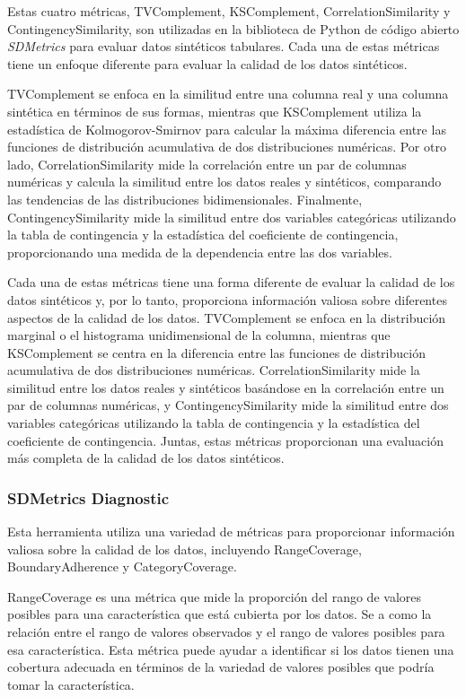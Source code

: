 Estas cuatro métricas, TVComplement, KSComplement, CorrelationSimilarity y ContingencySimilarity, son utilizadas en la biblioteca de Python de código abierto \emph{SDMetrics} para evaluar datos sintéticos tabulares. Cada una de estas métricas tiene un enfoque diferente para evaluar la calidad de los datos sintéticos.

TVComplement se enfoca en la similitud entre una columna real y una columna sintética en términos de sus formas, mientras que KSComplement utiliza la estadística de Kolmogorov-Smirnov para calcular la máxima diferencia entre las funciones de distribución acumulativa de dos distribuciones numéricas. Por otro lado, CorrelationSimilarity mide la correlación entre un par de columnas numéricas y calcula la similitud entre los datos reales y sintéticos, comparando las tendencias de las distribuciones bidimensionales. Finalmente, ContingencySimilarity mide la similitud entre dos variables categóricas utilizando la tabla de contingencia y la estadística del coeficiente de contingencia, proporcionando una medida de la dependencia entre las dos variables.

Cada una de estas métricas tiene una forma diferente de evaluar la calidad de los datos sintéticos y, por lo tanto, proporciona información valiosa sobre diferentes aspectos de la calidad de los datos. TVComplement se enfoca en la distribución marginal o el histograma unidimensional de la columna, mientras que KSComplement se centra en la diferencia entre las funciones de distribución acumulativa de dos distribuciones numéricas. CorrelationSimilarity mide la similitud entre los datos reales y sintéticos basándose en la correlación entre un par de columnas numéricas, y ContingencySimilarity mide la similitud entre dos variables categóricas utilizando la tabla de contingencia y la estadística del coeficiente de contingencia. Juntas, estas métricas proporcionan una evaluación más completa de la calidad de los datos sintéticos.

\subsubsection{SDMetrics Diagnostic}

Esta herramienta utiliza una variedad de métricas para proporcionar información valiosa sobre la calidad de los datos, incluyendo RangeCoverage, BoundaryAdherence y CategoryCoverage.

RangeCoverage es una métrica que mide la proporción del rango de valores posibles para una característica que está cubierta por los datos. Se a como la relación entre el rango de valores observados y el rango de valores posibles para esa característica. Esta métrica puede ayudar a identificar si los datos tienen una cobertura adecuada en términos de la variedad de valores posibles que podría tomar la característica.

